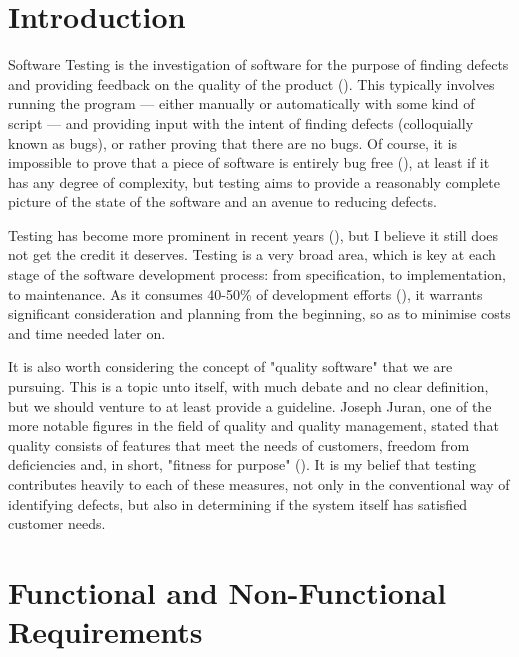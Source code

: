 \documentclass[12pt]{article}
\begin{document}
\pagebreak


\tableofcontents
\pagebreak



\section{Introduction}

Software Testing is the investigation of software for the purpose of finding defects and providing feedback on the quality of the product (). This typically involves running the program --- either manually or automatically with some kind of script --- and providing input with the intent of finding defects (colloquially known as bugs), or rather proving that there are no bugs. Of course, it is impossible to prove that a piece of software is entirely bug free (), at least if it has any degree of complexity, but testing aims to provide a reasonably complete picture of the state of the software and an avenue to reducing defects.

Testing has become more prominent in recent years (), but I believe it still does not get the credit it deserves. Testing is a very broad area, which is key at each stage of the software development process: from specification, to implementation, to maintenance. As it consumes 40-50\% of development efforts (), it warrants significant consideration and planning from the beginning, so as to minimise costs and time needed later on.

It is also worth considering the concept of "quality software" that we are pursuing. This is a topic unto itself, with much debate and no clear definition, but we should venture to at least provide a guideline. Joseph Juran, one of the more notable figures in the field of quality and quality management, stated that quality consists of features that meet the needs of customers, freedom from deficiencies and, in short, "fitness for purpose" (). It is my belief that testing contributes heavily to each of these measures, not only in the conventional way of identifying defects, but also in determining if the system itself has satisfied customer needs.



\section{Functional and Non-Functional Requirements} \label{reqs}
\end{document}
